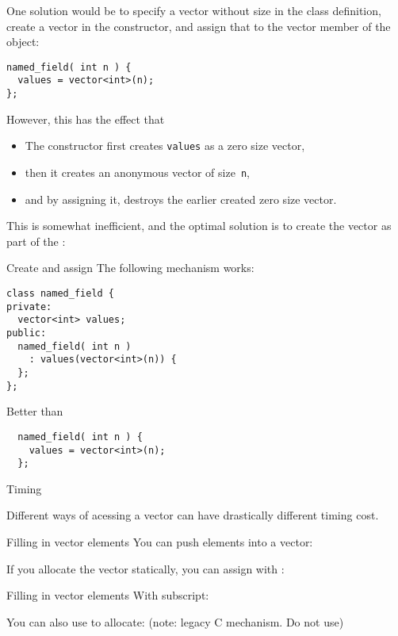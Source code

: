 One solution would be to specify a vector without size in the class
definition, create a vector in the constructor, and assign that
to the vector member of the object:
\begin{lstlisting}
named_field( int n ) {
  values = vector<int>(n);
};
\end{lstlisting}
However, this has the effect that
\begin{itemize}
\item The constructor first creates \lstinline{values} as a zero size vector,
\item then it creates an anonymous vector of size~\lstinline{n},
\item and by assigning it, destroys the earlier created zero size vector.
\end{itemize}
This is somewhat inefficient, and the optimal solution is
to create the vector as part of the
:

\begin{slide}{Create and assign}
  \label{sl:class-has-vector}
  The following mechanism works:
\begin{lstlisting}
class named_field {
private:
  vector<int> values;
public:
  named_field( int n )
    : values(vector<int>(n)) {
  };
};
\end{lstlisting}
Better than
\begin{lstlisting}
  named_field( int n ) {
    values = vector<int>(n);
  };
\end{lstlisting}
\end{slide}

 {Timing}

Different ways of acessing a vector can have drastically different
timing cost.

\begin{block}{Filling in vector elements}
  \label{sl:vect-extend-code}
  You can push elements into a vector:

  If you allocate the vector statically, you can assign with :
\end{block}

\begin{block}{Filling in vector elements}
  \label{sl:vect-extend-code2}
  With subscript:

  You can also use  to allocate:
  (note: legacy C mechanism. Do not use)
\end{block}

